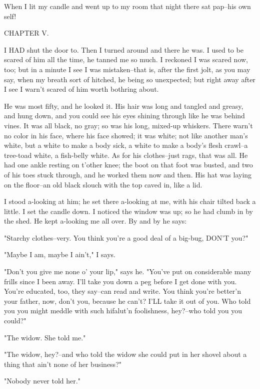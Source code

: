 When I lit my candle and went up to my room that night there sat pap--his
own self!




CHAPTER V.

I HAD shut the door to.  Then I turned around and there he was.  I used
to be scared of him all the time, he tanned me so much.  I reckoned I was
scared now, too; but in a minute I see I was mistaken--that is, after the
first jolt, as you may say, when my breath sort of hitched, he being so
unexpected; but right away after I see I warn't scared of him worth
bothring about.

He was most fifty, and he looked it.  His hair was long and tangled and
greasy, and hung down, and you could see his eyes shining through like he
was behind vines.  It was all black, no gray; so was his long, mixed-up
whiskers.  There warn't no color in his face, where his face showed; it
was white; not like another man's white, but a white to make a body sick,
a white to make a body's flesh crawl--a tree-toad white, a fish-belly
white.  As for his clothes--just rags, that was all.  He had one ankle
resting on t'other knee; the boot on that foot was busted, and two of his
toes stuck through, and he worked them now and then.  His hat was laying
on the floor--an old black slouch with the top caved in, like a lid.

I stood a-looking at him; he set there a-looking at me, with his chair
tilted back a little.  I set the candle down.  I noticed the window was
up; so he had clumb in by the shed.  He kept a-looking me all over.  By
and by he says:

"Starchy clothes--very.  You think you're a good deal of a big-bug, DON'T
you?"

"Maybe I am, maybe I ain't," I says.

"Don't you give me none o' your lip," says he.  "You've put on
considerable many frills since I been away.  I'll take you down a peg
before I get done with you.  You're educated, too, they say--can read and
write.  You think you're better'n your father, now, don't you, because he
can't?  I'LL take it out of you.  Who told you you might meddle with such
hifalut'n foolishness, hey?--who told you you could?"

"The widow.  She told me."

"The widow, hey?--and who told the widow she could put in her shovel
about a thing that ain't none of her business?"

"Nobody never told her."

